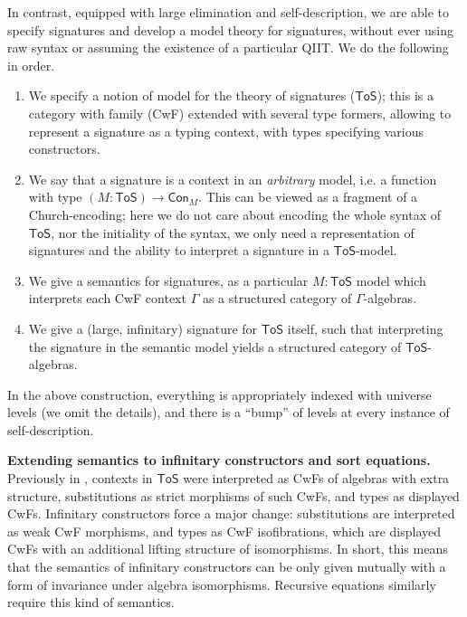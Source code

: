 \documentclass{easychair}
\newcommand{\ToS}{\mathsf{ToS}}
\begin{document}
In contrast, equipped with large elimination and self-description, we are able
to specify signatures and develop a model theory for signatures, without ever
using raw syntax or assuming the existence of a particular QIIT. We do the
following in order.
\begin{enumerate}
  \item
  We specify a notion of model for the theory of signatures ($\ToS$); this is a
  category with family (CwF) extended with several type formers, allowing to
  represent a signature as a typing context, with types specifying various
  constructors.
  \item We say that a signature is a context in an \emph{arbitrary} model, i.e.
  a function with type $(M : \mathsf{ToS})\to\mathsf{Con}_M$. This can be
  viewed as a fragment of a Church-encoding; here we do not care about
  encoding the whole syntax of $\ToS$, nor the initiality of the syntax, we only
  need a representation of signatures and the ability to interpret a signature in
  a $\mathsf{ToS}$-model.
  \item We give a semantics for signatures, as a particular $M : \mathsf{ToS}$
    model which interprets each CwF context $\Gamma$ as a structured category of
    $\Gamma$-algebras.
  \item We give a (large, infinitary) signature for $\mathsf{ToS}$ itself, such
    that interpreting the signature in the semantic model yields a structured
    category of $\mathsf{ToS}$-algebras.
\end{enumerate}
In the above construction, everything is appropriately indexed with universe
levels (we omit the details), and there is a ``bump'' of levels at every
instance of self-description.

\textbf{Extending semantics to infinitary constructors and sort equations.}
Previously in \cite{kaposi2019constructing}, contexts in $\ToS$ were interpreted
as CwFs of algebras with extra structure, substitutions as strict morphisms of
such CwFs, and types as displayed CwFs. Infinitary constructors force a major
change: substitutions are interpreted as weak CwF morphisms, and types as CwF
isofibrations, which are displayed CwFs with an additional lifting structure of
isomorphisms. In short, this means that the semantics of infinitary constructors
can be only given mutually with a form of invariance under algebra
isomorphisms. Recursive equations similarly require this kind of semantics.
\end{document}
